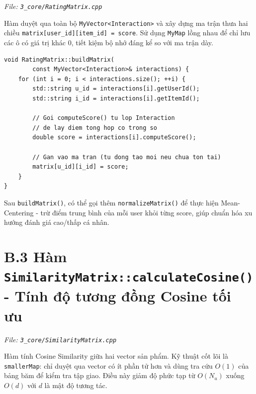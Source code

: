 \documentclass{report}
\begin{document}
\textit{File: \texttt{3\_core/RatingMatrix.cpp}}

Hàm duyệt qua toàn bộ \texttt{MyVector<Interaction>} và xây dựng ma trận thưa hai chiều \texttt{matrix[user\_id][item\_id] = score}. Sử dụng \texttt{MyMap} lồng nhau để chỉ lưu các ô có giá trị khác 0, tiết kiệm bộ nhớ đáng kể so với ma trận dày.

\begin{lstlisting}[caption={Hàm buildMatrix() - File 3\_core/RatingMatrix.cpp}, label={lst:build_matrix}]
void RatingMatrix::buildMatrix(
        const MyVector<Interaction>& interactions) {
    for (int i = 0; i < interactions.size(); ++i) {
        std::string u_id = interactions[i].getUserId();
        std::string i_id = interactions[i].getItemId();

        // Goi computeScore() tu lop Interaction
        // de lay diem tong hop co trong so
        double score = interactions[i].computeScore();

        // Gan vao ma tran (tu dong tao moi neu chua ton tai)
        matrix[u_id][i_id] = score;
    }
}
\end{lstlisting}

Sau \texttt{buildMatrix()}, có thể gọi thêm \texttt{normalizeMatrix()} để thực hiện Mean-Centering - trừ điểm trung bình của mỗi user khỏi từng score, giúp chuẩn hóa xu hướng đánh giá cao/thấp cá nhân.

\section*{B.3 Hàm \texttt{SimilarityMatrix::calculateCosine()} - Tính độ tương đồng Cosine tối ưu}

\textit{File: \texttt{3\_core/SimilarityMatrix.cpp}}

Hàm tính Cosine Similarity giữa hai vector sản phẩm. Kỹ thuật cốt lõi là \texttt{smallerMap}: chỉ duyệt qua vector có ít phần tử hơn và dùng tra cứu $O(1)$ của bảng băm để kiểm tra tập giao. Điều này giảm độ phức tạp từ $O(N_u)$ xuống $O(d)$ với $d$ là mật độ tương tác.
\end{document}
